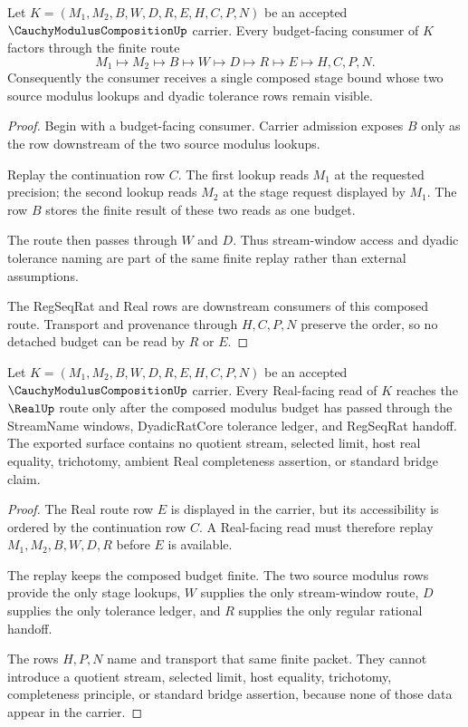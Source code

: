 \begin{theorem}
\label{thm:cauchy-modulus-composition-budget-composition}
Let $K=(M_1,M_2,B,W,D,R,E,H,C,P,N)$ be an accepted $\CauchyModulusCompositionUp$ carrier. Every budget-facing consumer of $K$ factors through the finite route
$$
M_1 \longmapsto M_2 \longmapsto B \longmapsto W \longmapsto D \longmapsto R \longmapsto E \longmapsto H,C,P,N .
$$
Consequently the consumer receives a single composed stage bound whose two source modulus lookups and dyadic tolerance rows remain visible.
\end{theorem}
\begin{proof}
Begin with a budget-facing consumer. Carrier admission exposes $B$ only as the row downstream of the two source modulus lookups.

Replay the continuation row $C$. The first lookup reads $M_1$ at the requested precision; the second lookup reads $M_2$ at the stage request displayed by $M_1$. The row $B$ stores the finite result of these two reads as one budget.

The route then passes through $W$ and $D$. Thus stream-window access and dyadic tolerance naming are part of the same finite replay rather than external assumptions.

The RegSeqRat and Real rows are downstream consumers of this composed route. Transport and provenance through $H,C,P,N$ preserve the order, so no detached budget can be read by $R$ or $E$.
\end{proof}

\begin{theorem}
\label{thm:cauchy-modulus-composition-real-route}
Let $K=(M_1,M_2,B,W,D,R,E,H,C,P,N)$ be an accepted $\CauchyModulusCompositionUp$ carrier. Every Real-facing read of $K$ reaches the $\RealUp$ route only after the composed modulus budget has passed through the StreamName windows, DyadicRatCore tolerance ledger, and RegSeqRat handoff. The exported surface contains no quotient stream, selected limit, host real equality, trichotomy, ambient Real completeness assertion, or standard bridge claim.
\end{theorem}
\begin{proof}
The Real route row $E$ is displayed in the carrier, but its accessibility is ordered by the continuation row $C$. A Real-facing read must therefore replay $M_1,M_2,B,W,D,R$ before $E$ is available.

The replay keeps the composed budget finite. The two source modulus rows provide the only stage lookups, $W$ supplies the only stream-window route, $D$ supplies the only tolerance ledger, and $R$ supplies the only regular rational handoff.

The rows $H,P,N$ name and transport that same finite packet. They cannot introduce a quotient stream, selected limit, host equality, trichotomy, completeness principle, or standard bridge assertion, because none of those data appear in the carrier.
\end{proof}


